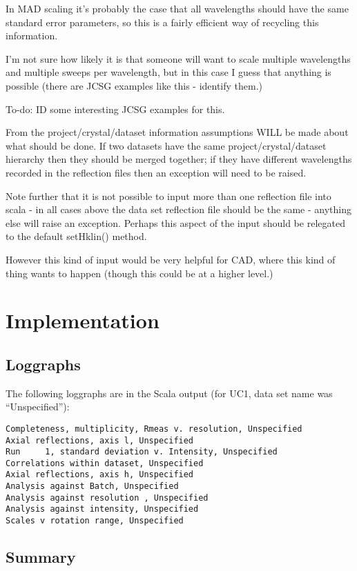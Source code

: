 \documentclass[a4paper, 11pt]{article}
\begin{document}
In MAD scaling it's probably the case that all wavelengths should have the 
same standard error parameters, so this is a fairly efficient way of 
recycling this information.

I'm not sure how likely it is that someone will want to scale multiple
wavelengths and multiple sweeps per wavelength, but in this case I guess
that anything is possible (there are JCSG examples like this - identify 
them.)

To-do: ID some interesting JCSG examples for this.

From the project/crystal/dataset information assumptions WILL be made about
what should be done. If two datasets have the same project/crystal/dataset
hierarchy then they should be merged together; if they have different 
wavelengths recorded in the reflection files then an exception will need
to be raised.

Note further that it is not possible to input more than one reflection
file into scala - in all cases above the data set reflection file
should be the same - anything else will raise an exception. Perhaps this 
aspect of the input should be relegated to the default setHklin() method.

However this kind of input would be very helpful for CAD, where this kind
of thing wants to happen (though this could be at a higher level.)

\section{Implementation}

\subsection{Loggraphs}

The following loggraphs are in the Scala output (for UC1, data set name
was ``Unspecified''):

{
\tiny
\begin{verbatim}
Completeness, multiplicity, Rmeas v. resolution, Unspecified
Axial reflections, axis l, Unspecified
Run     1, standard deviation v. Intensity, Unspecified
Correlations within dataset, Unspecified
Axial reflections, axis h, Unspecified
Analysis against Batch, Unspecified
Analysis against resolution , Unspecified
Analysis against intensity, Unspecified
Scales v rotation range, Unspecified
\end{verbatim}
}

\subsection{Summary}
\end{document}
